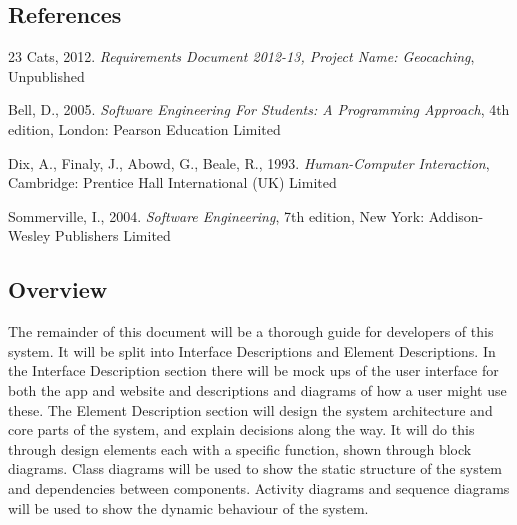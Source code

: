 





\subsection{References}

23 Cats, 2012. \emph{Requirements Document 2012-13, Project Name: Geocaching}, Unpublished

Bell, D., 2005. \emph{Software Engineering For Students: A Programming Approach}, 4th edition, London: Pearson Education Limited

Dix, A., Finaly, J., Abowd, G., Beale, R., 1993. \emph{Human-Computer Interaction}, Cambridge: Prentice Hall International (UK) Limited

Sommerville, I., 2004. \emph{Software Engineering}, 7th edition, New York: Addison-Wesley Publishers Limited

\subsection{Overview}

The remainder of this document will be a thorough guide for developers of this system. It will be split into Interface Descriptions and Element Descriptions. In the Interface Description section there will be mock ups of the user interface for both the app and website and descriptions and diagrams of how a user might use these. The Element Description section will design the system architecture and core parts of the system, and explain decisions along the way. It will do this through design elements each with a specific function, shown through block diagrams. Class diagrams will be used to show the static structure of the system and dependencies between components. Activity diagrams and sequence diagrams will be used to show the dynamic behaviour of the system.



